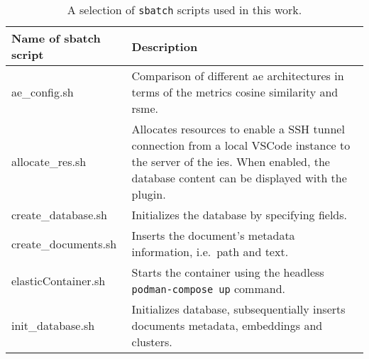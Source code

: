 \begin{table}[]
    \caption{A selection of \texttt{sbatch} scripts used in this work.}
    \begin{tabular}{|
    >{\columncolor[HTML]{EFEFEF}}p{} |p{}|}
    \hline
    \cellcolor[HTML]{C0C0C0}\textbf{Name of sbatch script} & \cellcolor[HTML]{C0C0C0}\textbf{Description}                                                                                                                                                                                                                      \\ \hline
    ae\_config.sh                                          & Comparison of different \ac{ae} architectures in terms of the metrics cosine similarity and \ac{rsme}.                                                                                                                                                                     \\ \hline
    allocate\_res.sh                                       & Allocates resources to enable a SSH tunnel connection from a local VSCode instance to the server of the \ac{ies}. 
                                                                When enabled, the database content can be displayed with the \databaseName{} plugin.\\ \hline
    create\_database.sh                                    & Initializes the database by specifying fields.                                                                                                                                                                                                                    \\ \hline
    create\_documents.sh                                   & Inserts the document's metadata information, i.e.\ path and text.                                                                                                                                                                                                   \\ \hline
    elasticContainer.sh                                    & Starts the \databaseName{} container using the headless \texttt{podman-compose up} command.                                                                                                                                     \\ \hline
    init\_database.sh                                      & Initializes database, subsequentially inserts documents metadata, embeddings and clusters.                                                                                                                                                                        \\ \hline

\end{tabular}
\end{table}
